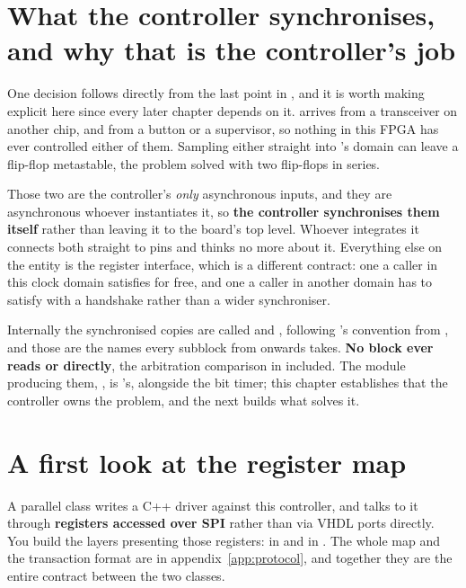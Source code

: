 \section{What the controller synchronises, and why that is the controller's job}
\label{c11:sec:sync}

One decision follows directly from the last point in , and it is worth
making explicit here since every later chapter depends on it.  arrives from a
transceiver on another chip, and  from a button or a supervisor, so nothing in this
FPGA has ever controlled either of them. Sampling either straight into 's domain can
leave a flip-flop metastable, the problem  solved with two flip-flops in series.

Those two are the controller's \emph{only} asynchronous inputs, and they are asynchronous whoever
instantiates it, so \textbf{the controller synchronises them itself} rather than leaving it to the
board's top level. Whoever integrates it connects both straight to pins and thinks no more about it.
Everything else on the entity is the register interface, which is a different contract: one a caller
in this clock domain satisfies for free, and one a caller in another domain has to satisfy with a
handshake rather than a wider synchroniser.

Internally the synchronised copies are called  and , following
's convention from , and those are the names every subblock from
 onwards takes. \textbf{No block ever reads  or 
directly}, the arbitration comparison in  included. The module producing them,
, is 's, alongside the bit timer; this chapter establishes that the
controller owns the problem, and the next builds what solves it.

\section{A first look at the register map}
\label{c11:sec:regmap}

A parallel class writes a C++ driver against this controller, and talks to it through
\textbf{registers accessed over SPI} rather than via VHDL ports directly. You build the layers
presenting those registers:  in  and  in
. The whole map and the transaction format are in appendix~\ref{app:protocol}, and
together they are the entire contract between the two classes.

